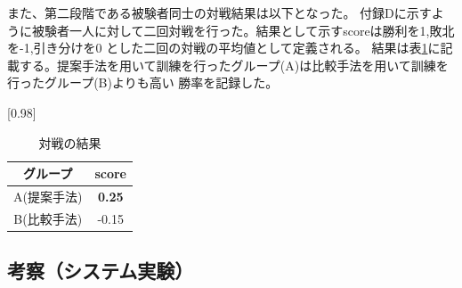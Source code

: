 \begin{table}[H]
    \caption{先読み手数制限なしの場合}
    \scriptsize
    \centering
    \label{table:system-100}
\end{table}
また、第二段階である被験者同士の対戦結果は以下となった。
付録Dに示すように被験者一人に対して二回対戦を行った。結果として示すscoreは勝利を1,敗北を-1,引き分けを0
とした二回の対戦の平均値として定義される。
結果は表\ref{table:result-battle}に記載する。提案手法を用いて訓練を行ったグループ(A)は比較手法を用いて訓練を行ったグループ(B)よりも高い
勝率を記録した。
\begin{table}[H]
	\caption{対戦の結果}
	\centering
	\scalebox{0.98}[0.98]{
		\begin{tabular}{c|c}
			グループ & score \\ \hline
			A(提案手法)    & \bf{0.25} \\ 
			B(比較手法)    & -0.15 \\
		\end{tabular}
	}
	\label{table:result-battle}
\end{table}
\subsection{考察（システム実験）}

